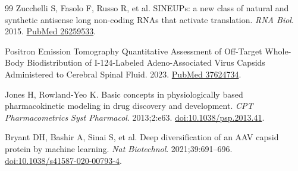 \documentclass[UTF8,11pt,a4paper]{ctexart}
\begin{document}
\begin{thebibliography}{99}
Zucchelli S, Fasolo F, Russo R, et al. SINEUPs: a new class of natural and synthetic antisense long non-coding RNAs that activate translation. \textit{RNA Biol}. 2015. \href{https://pubmed.ncbi.nlm.nih.gov/26259533/}{PubMed 26259533}.

Positron Emission Tomography Quantitative Assessment of Off-Target Whole-Body Biodistribution of I-124-Labeled Adeno-Associated Virus Capsids Administered to Cerebral Spinal Fluid. 2023. \href{https://pubmed.ncbi.nlm.nih.gov/37624734/}{PubMed 37624734}.

Jones H, Rowland-Yeo K. Basic concepts in physiologically based pharmacokinetic modeling in drug discovery and development. \textit{CPT Pharmacometrics Syst Pharmacol}. 2013;2:e63. \href{https://doi.org/10.1038/psp.2013.41}{doi:10.1038/psp.2013.41}.

Bryant DH, Bashir A, Sinai S, et al. Deep diversification of an AAV capsid protein by machine learning. \textit{Nat Biotechnol}. 2021;39:691--696. \href{https://doi.org/10.1038/s41587-020-00793-4}{doi:10.1038/s41587-020-00793-4}.

\end{thebibliography}
\end{document}
